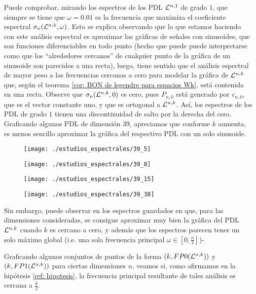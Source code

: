 Puede comprobar, mirando los espectros
de los PDL $\mathcal{L}^{n,1}$ de grado $1$,
que siempre se tiene que $ \omega = 0.01$ es la frecuencia
que maximiza el coeficiente espectral
$\sigma_{n}(\mathcal{L}^{n,k}, \omega)$.
Esto se explica observando que
lo que estamos haciendo con este análisis espectral
es aproximar las gráficas de señales con sinusoides, que son
funciones diferenciables en todo punto
(hecho que puede
puede interpretarse
como que los ``alrededores
cercanos'' de cualquier
punto de la gráfica de un sinusoide son 
parecidos a una recta), luego, tiene sentido que  
el análisis espectral de mayor peso a las 
frecuencias cercanas a cero
para modelar la gráfica de $\mathcal{L}^{n,k}$
que, según el teorema 
\ref{cor: BON de legendre para espacios Wk}, está contenida
en una recta. Observe que 
$\sigma_{n}(\mathcal{L}^{n,k}, 0)$ es cero, pues
$P_{n, 0}$ está generado por
$c_{n,0}$, que es el vector constante uno, y que 
es ortogonal a $\mathcal{L}^{n,k}$. Así, los espectros
de los PDL de grado $1$ tienen una discontinuidad de salto
por la derecha del cero. \\


Graficando algunos PDL de dimensión
39, apreciamos que conforme $k$ aumenta, es menos
sencillo aproximar la gráfica del respectivo PDL
con un solo sinusoide.
\begin{figure}[H]
	\sidecaption{
	}
	\centering
	\texttt{[image: ./estudios\_espectrales/39\_5]} 
\end{figure}	
\begin{figure}[H]
	\sidecaption{
	}
	\centering
	\texttt{[image: ./estudios\_espectrales/39\_8]} 
\end{figure}	
\begin{figure}[H]
	\sidecaption{
	}
	\centering
	\texttt{[image: ./estudios\_espectrales/39\_15]} 
\end{figure}	
\begin{figure}[H]
	\sidecaption{
	}
	\centering
	\texttt{[image: ./estudios\_espectrales/39\_38]} 
\end{figure}	

Sin embargo, puede observar en los espectros guardados en 
 que, para las dimensiones consideradas,
se consigue aproximar muy bien la gráfica del PDL
$\mathcal{L}^{n,k}$ cuando $k$ es cercano a cero, y además 
que los espectros parecen tener un solo máximo global
(i.e. una sola frecuencia principal 
$\omega \in \left[0, \frac{n}{2} \right]$)-

Graficando algunos conjuntos de puntos
de la forma
$(k, FP0(\mathcal{L}^{n,k}))$ y 
$(k, FP1(\mathcal{L}^{n,k}))$ para ciertas
dimensiones $n$, veamos si, como 
afirmamos en la hipótesis 
\ref{ref: hipotesis}, la frecuencia principal
resultante de tales análisis es cercana
a $\frac{k}{2}$.

